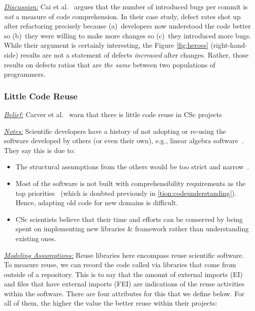 \documentclass[conference,10pt]{IEEEtran}
\newcommand{\bi}{\begin{itemize}}
\newcommand{\ei}{\end{itemize}}
\begin{document}
\noindent \textit{\underline{Discussion:}} 
Cai et al.~\cite{cai19_debt} argues that the number of introduced bugs
per commit is {\em not} a measure of code comprehension.
In their case study, defect rates shot up after refactoring
precisely because (a)~developers now understood the code better so (b)~they were willing to make more changes so (c)~they
introduced more bugs. While their argument is certainly interesting, the Figure \ref{fig:heroes} (right-hand-side) results
are not a statement of defects {\em increased} after changes.
Rather, those results on defects ratios that are {\em the same} between two populations of programmers. \\


\subsubsection{Little Code Reuse}\label{tion:reuse} 

\noindent \textit{\underline{Belief:}} 
Carver et al.~\cite{segal_enduser, carver06_hpc, Shull05_parallel, sanders08_risk} warn that there is little
code reuse in CSc projects

\noindent \textit{\underline{Notes:}} 
Scientific developers have a history of not adopting or re-using the software developed by others (or even their own), e.g., linear algebra software~\cite{johan18_secs}. They 
say this is due to:

\bi
\item The structural assumptions from the others would be too strict and narrow~\cite{carver06_hpc, basili08_hpc}.
\item Most of the software is not built with comprehensibility requirements as the top priorities~\cite{segal_enduser} (which is doubted previously in \ref{tion:codeunderstanding}). Hence, adapting old code for new domains is difficult. 
\item
CSc scientists believe that their time and efforts can be conserved by being spent on implementing new libraries \& framework rather than understanding existing ones.
\ei
\noindent \textit{\underline{Modeling Assumptions:}} Reuse libraries here encompass reuse scientific software. To
measure reuse, we can record the code called
via libraries that come from outside of a repository. This is to say that the amount of external imports (EI) and files that have external imports (FEI) are indications of the reuse activities within the software. There are four attributes for this that we define below. For all of them, the higher the value the better reuse within their projects: 
\end{document}
